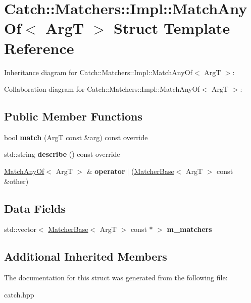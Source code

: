 \hypertarget{structCatch_1_1Matchers_1_1Impl_1_1MatchAnyOf}{}\section{Catch\+:\+:Matchers\+:\+:Impl\+:\+:Match\+Any\+Of$<$ ArgT $>$ Struct Template Reference}
\label{structCatch_1_1Matchers_1_1Impl_1_1MatchAnyOf}


Inheritance diagram for Catch\+:\+:Matchers\+:\+:Impl\+:\+:Match\+Any\+Of$<$ ArgT $>$\+:


Collaboration diagram for Catch\+:\+:Matchers\+:\+:Impl\+:\+:Match\+Any\+Of$<$ ArgT $>$\+:
\subsection*{Public Member Functions}
\begin{DoxyCompactItemize}
\item 
\mbox{\label{structCatch_1_1Matchers_1_1Impl_1_1MatchAnyOf_a8a3e8338f979e56277dcf553efb78dc0}} 
bool {\bfseries match} (ArgT const \&arg) const override
\item 
\mbox{\label{structCatch_1_1Matchers_1_1Impl_1_1MatchAnyOf_a315285204df93d1f8e72f50dd66eb709}} 
std\+::string {\bfseries describe} () const override
\item 
\mbox{\label{structCatch_1_1Matchers_1_1Impl_1_1MatchAnyOf_a44d7582dbe09fc31b9a5ba8a6367b506}} 
\hyperlink{structCatch_1_1Matchers_1_1Impl_1_1MatchAnyOf}{Match\+Any\+Of}$<$ ArgT $>$ \& {\bfseries operator$\vert$$\vert$} (\hyperlink{structCatch_1_1Matchers_1_1Impl_1_1MatcherBase}{Matcher\+Base}$<$ ArgT $>$ const \&other)
\end{DoxyCompactItemize}
\subsection*{Data Fields}
\begin{DoxyCompactItemize}
\item 
\mbox{\label{structCatch_1_1Matchers_1_1Impl_1_1MatchAnyOf_a1fb1119e6110dc15b8d5262ec0aeddd5}} 
std\+::vector$<$ \hyperlink{structCatch_1_1Matchers_1_1Impl_1_1MatcherBase}{Matcher\+Base}$<$ ArgT $>$ const  $\ast$ $>$ {\bfseries m\+\_\+matchers}
\end{DoxyCompactItemize}
\subsection*{Additional Inherited Members}


The documentation for this struct was generated from the following file\+:\begin{DoxyCompactItemize}
\item 
catch.\+hpp\end{DoxyCompactItemize}
